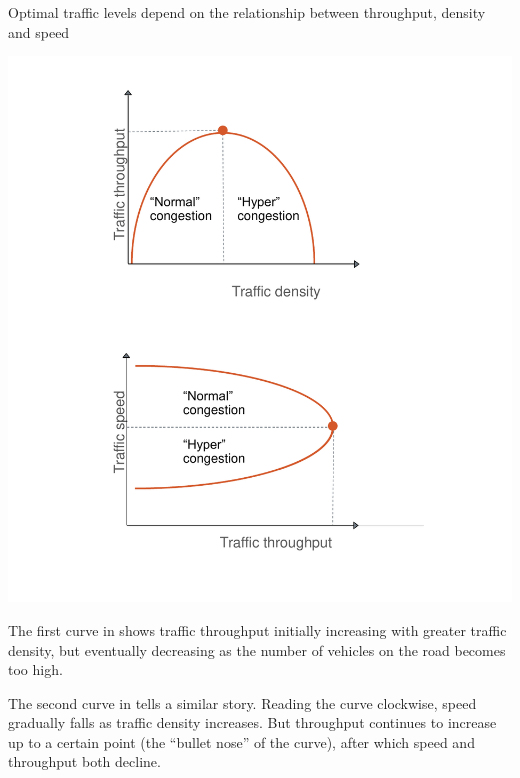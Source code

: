 \documentclass{grattan}
\begin{document}
\begin{figureTop}
\caption{Optimal traffic levels depend on the relationship between throughput, density and speed}\label{fig:Arnott-flow-curves}
\includegraphics[page=1]{Charts/ChartPackLong.pdf}
\end{figureTop}

The first curve in  shows traffic throughput initially increasing with greater traffic density, but eventually decreasing as the number of vehicles on the road becomes too high.

The second curve in  tells a similar story.
Reading the curve clockwise, speed gradually falls as traffic density increases.
But throughput continues to increase up to a certain point (the ``bullet nose'' of the curve), after which speed and throughput both decline.
\end{document}
